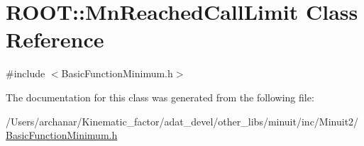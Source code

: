 \hypertarget{classROOT_1_1Minuit2_1_1BasicFunctionMinimum_1_1MnReachedCallLimit}{}\section{R\+O\+OT\+:\+:Mn\+Reached\+Call\+Limit Class Reference}
\label{classROOT_1_1Minuit2_1_1BasicFunctionMinimum_1_1MnReachedCallLimit}


{\ttfamily \#include $<$Basic\+Function\+Minimum.\+h$>$}



The documentation for this class was generated from the following file\+:\begin{DoxyCompactItemize}
\item 
/\+Users/archanar/\+Kinematic\+\_\+factor/adat\+\_\+devel/other\+\_\+libs/minuit/inc/\+Minuit2/\mbox{\hyperlink{other__libs_2minuit_2inc_2Minuit2_2BasicFunctionMinimum_8h}{Basic\+Function\+Minimum.\+h}}\end{DoxyCompactItemize}
